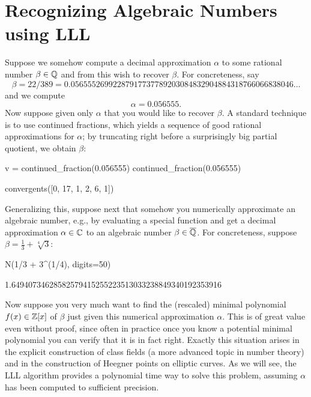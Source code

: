 \section{Recognizing Algebraic Numbers using LLL}\label{sec:LLL}

Suppose we somehow compute a decimal approximation $\alpha$
to some rational number $\beta \in \mathbb{Q}$ and from this wish
to recover $\beta$.  For concreteness, say
$$\beta= 22/389 = 0.05655526992287917737789203084832904884318766066838046\ldots$$
and we compute
$$
  \alpha = 0.056555.
$$
Now suppose given only $\alpha$ that you would like to recover
$\beta$.  A standard technique is to use continued fractions, which
yields a sequence of good rational approximations
for $\alpha$; by truncating right before a surprisingly big
partial quotient, we obtain $\beta$:
\begin{sagecode}
\begin{sagecell}
v = continued_fraction(0.056555)
continued_fraction(0.056555)
\end{sagecell}
\begin{sageout}
[0, 17, 1, 2, 6, 1, 23, 1, 1, 1, 1, 1, 2]
\end{sageout}
\begin{sagecell}
convergents([0, 17, 1, 2, 6, 1])
\end{sagecell}
\begin{sageout}
[0, 1/17, 1/18, 3/53, 19/336, 22/389]
\end{sageout}
\end{sagecode}

   
Generalizing this, suppose next that somehow you numerically approximate
an algebraic number, e.g., by evaluating a special
function and get a decimal approximation $\alpha \in \mathbb{C}$
to an algebraic number $\beta \in \overline{\mathbb{Q}}$.  For concreteness,
suppose $\beta = \frac{1}{3} + \sqrt[4]{3}$:
\begin{sagecode}
\begin{sagecell}
N(1/3 + 3^(1/4), digits=50)
\end{sagecell}
\begin{sageout}
1.64940734628582579415255223513033238849340192353916
\end{sageout}
\end{sagecode}
Now suppose you very much want to find the (rescaled) 
minimal polynomial $f(x) \in \mathbb{Z}[x]$
of $\beta$ just given this numerical approximation $\alpha$.
This is of great value even without proof, since often in practice
once you know a potential minimal polynomial you can
verify that it is in fact right.  Exactly this situation
arises in the explicit construction of class fields (a
more advanced topic in number theory) and in the construction
of Heegner points on elliptic curves.   As we will see, the
LLL algorithm provides a polynomial time way to solve this
problem, assuming $\alpha$ has been computed to
sufficient precision. 

